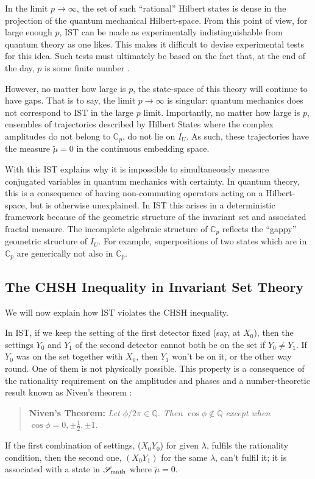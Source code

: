 \documentclass[12pt,superscriptaddress]{revtex4-2}
\begin{document}
In the limit $p \rightarrow \infty$, the set of such ``rational'' Hilbert states is dense in the projection of the quantum mechanical Hilbert-space. From this point of view, for large enough $p$, {\sc IST} can be made as experimentally indistinguishable from quantum theory as one likes. This makes it difficult to devise experimental tests for this idea. Such tests must ultimately be based on the fact that, at the end of the day, $p$ is some finite number \cite{Hance2021ExpIST}. 

However, no matter how large is $p$, the state-space of this theory will continue to have gaps. That is to say, the limit $p \rightarrow \infty$ is singular: quantum mechanics does not correspond to {\sc IST} in the large $p$ limit. Importantly, no matter how large is $p$, ensembles of trajectories described by Hilbert States where the complex amplitudes do not belong to $\mathbb C_p$, do not lie on $I_U$. As such, these trajectories have the measure $\tilde \mu=0$ in the continuous embedding space. 

With this {\sc IST} explains why it is impossible to simultaneously measure conjugated variables in quantum mechanics with certainty. In quantum theory, this is a consequence of having non-commuting operators acting on a Hilbert-space, but is otherwise unexplained. In {\sc IST} this arises in a deterministic framework because of the geometric structure of the invariant set and associated fractal measure. The incomplete algebraic structure of ${\mathbb C}_p$ reflects the ``gappy'' geometric structure of $I_U$. For example, superpositions of two states which are in ${\mathbb C}_p$ are generically not also in ${\mathbb C}_p$. 

\subsection{The CHSH Inequality in Invariant Set Theory}
\label{CHSHIST}

We will now explain how {\sc IST} violates the {\sc CHSH} inequality.

In {\sc IST}, if we keep the setting of the first detector fixed (say, at $X_0$), then the settings $Y_0$ and $Y_1$ of the second detector cannot both be on the set if $Y_0 \neq Y_1$. If $Y_0$ was on the set together with $X_0$, then $Y_1$ won't be on it, or the other way round. One of them is not physically possible. This property is a consequence of the rationality requirement on the amplitudes and phases and a number-theoretic result known as Niven's theorem
 \cite{Niven1956irrational,Jahnel2010Sines}:
\begin{quote}
{\bf Niven's Theorem:}
 \emph{Let $\phi/2\pi \in \mathbb{Q}$. Then $\cos \phi \notin \mathbb{Q}$ except when $\cos \phi =0, \pm \frac{1}{2}, \pm 1$.}
\end{quote}
If the first combination of settings, ($X_0Y_0$) for given $\lambda$, fulfils the rationality condition, then the second one, $(X_0Y_1)$ for the same $\lambda$, can't fulfil it; it is associated with a state in ${\mathscr S}_{\rm math}$ where $\tilde \mu=0$. 
\end{document}
